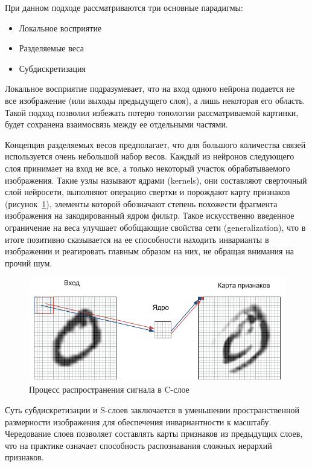 \documentclass[a4paper,14pt]{extarticle} %
\begin{document}
При данном подходе рассматриваются три основные парадигмы:
\begin{itemize}
\item Локальное восприятие
\item Разделяемые веса
\item Субдискретизация
\end{itemize}

Локальное восприятие подразумевает, что на вход одного нейрона подается не все изображение (или выходы предыдущего слоя), а лишь некоторая его область. Такой подход позволил избежать потерю топологии рассматриваемой картинки, будет сохранена взаимосвязь между ее отдельными частями. 

Концепция разделяемых весов предполагает, что для большого количества связей используется очень небольшой набор весов. Каждый из нейронов следующего слоя принимает на вход не все, а только некоторый участок обрабатываемого изображения. Такие узлы называют ядрами (kernels), они составляют сверточный слой нейросети, выполняют операцию свертки и порождают карту признаков (рисунок~\ref{fig:priznaki}), элементы которой обозначают степень похожести фрагмента изображения на закодированный ядром фильтр. Такое искусственно введенное ограничение на веса улучшает обобщающие свойства сети (generalization), что в итоге позитивно сказывается на ее способности находить инварианты в изображении и реагировать главным образом на них, не обращая внимания на прочий шум.

\begin{figure}[h]
\centering
\includegraphics[width=0.99\linewidth]{priznaki}
\caption{Процесс распространения сигнала в C-слое}
\label{fig:priznaki}
\end{figure}

Суть субдискретизации и S-слоев заключается в уменьшении пространственной размерности изображения для обеспечения инвариантности к масштабу. Чередование слоев позволяет составлять карты признаков из предыдущих слоев, что на практике означает способность распознавания сложных иерархий признаков.
\end{document}
